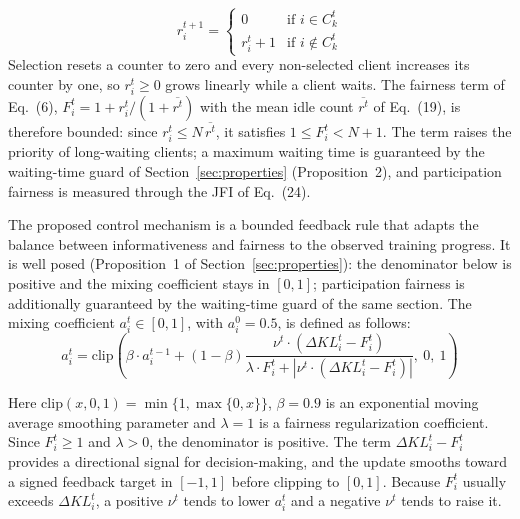\documentclass[pdflatex,sn-mathphys-num,oneside]{sn-jnl}%
\theoremstyle{thmstyleone}%
\theoremstyle{thmstyletwo}%
\theoremstyle{thmstylethree}%
\begin{document}
\begin{equation}
r_i^{t+1} =
\begin{cases}
0 & \text{if } i \in C_k^t  \\
r_i^t + 1 & \text{if } i \notin C_k^t
\end{cases}
\label{eq:idle_update}
\end{equation}
Selection resets a counter to zero and every non-selected client increases its counter by one, so $r_i^t\ge 0$ grows linearly while a client waits. The fairness term of Eq.~(6), $F_i^t = 1 + r_i^t/(1+\overline{r^t})$ with the mean idle count $\overline{r^t}$ of Eq.~(19), is therefore bounded: since $r_i^t\le N\,\overline{r^t}$, it satisfies $1 \le F_i^t < N+1$. The term raises the priority of long-waiting clients; a maximum waiting time is guaranteed by the waiting-time guard of Section~\ref{sec:properties} (Proposition~2), and participation fairness is measured through the JFI of Eq.~(24).

The proposed control mechanism is a bounded feedback rule that adapts the balance between informativeness and fairness to the observed training progress. It is well posed (Proposition~1 of Section~\ref{sec:properties}): the denominator below is positive and the mixing coefficient stays in $[0,1]$; participation fairness is additionally guaranteed by the waiting-time guard of the same section. The mixing coefficient $a_i^t \in [0,1]$, with $a_i^0=0.5$, is defined as follows:
\begin{equation}
a_i^t = \mathrm{clip}\left(
\beta \cdot a_i^{t-1} + (1-\beta)
\frac{
\nu^t \cdot (\Delta KL_i^t - F_i^t)
}{
\lambda \cdot F_i^t + \left|\nu^t \cdot (\Delta KL_i^t - F_i^t)\right|
},\ 0,\ 1\right)
\end{equation}

Here $\mathrm{clip}(x,0,1)=\min\{1,\max\{0,x\}\}$, $\beta=0.9$ is an exponential moving average smoothing parameter and $\lambda=1$ is a fairness regularization coefficient. Since $F_i^t \ge 1$ and $\lambda>0$, the denominator is positive. The term $\Delta KL_i^t - F_i^t$ provides a directional signal for decision-making, and the update smooths toward a signed feedback target in $[-1,1]$ before clipping to $[0,1]$. Because $F_i^t$ usually exceeds $\Delta KL_i^t$, a positive $\nu^t$ tends to lower $a_i^t$ and a negative $\nu^t$ tends to raise it.
\end{document}
